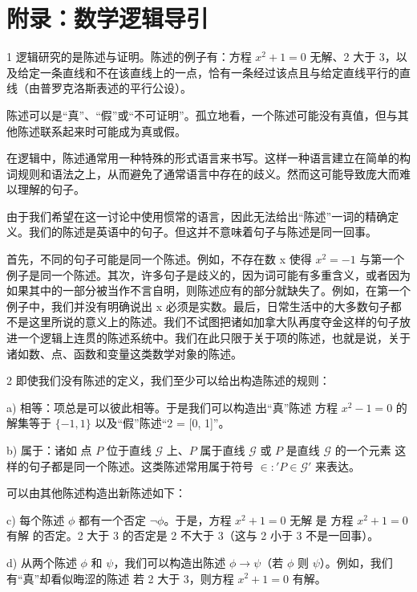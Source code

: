 \chapter*{附录：数学逻辑导引}

1 逻辑研究的是陈述与证明。陈述的例子有：方程  $ x^{2}+1=0 $ 无解、2 大于 3，以及给定一条直线和不在该直线上的一点，恰有一条经过该点且与给定直线平行的直线（由普罗克洛斯表述的平行公设）。

陈述可以是“真”、“假”或“不可证明”。孤立地看，一个陈述可能没有真值，但与其他陈述联系起来时可能成为真或假。

在逻辑中，陈述通常用一种特殊的形式语言来书写。这样一种语言建立在简单的构词规则和语法之上，从而避免了通常语言中存在的歧义。然而这可能导致庞大而难以理解的句子。

由于我们希望在这一讨论中使用惯常的语言，因此无法给出“陈述”一词的精确定义。我们的陈述是英语中的句子。但这并不意味着句子与陈述是同一回事。

首先，不同的句子可能是同一个陈述。例如，不存在数 x 使得  $ x^{2} = -1 $ 与第一个例子是同一个陈述。其次，许多句子是歧义的，因为词可能有多重含义，或者因为如果其中的一部分被当作不言自明，则陈述应有的部分就缺失了。例如，在第一个例子中，我们并没有明确说出 x 必须是实数。最后，日常生活中的大多数句子都不是这里所说的意义上的陈述。我们不试图把诸如加拿大队再度夺金这样的句子放进一个逻辑上连贯的陈述系统中。我们在此只限于关于项的陈述，也就是说，关于诸如数、点、函数和变量这类数学对象的陈述。

2 即使我们没有陈述的定义，我们至少可以给出构造陈述的规则：

a) 相等：项总是可以彼此相等。于是我们可以构造出“真”陈述 方程  $ x^2 - 1 = 0 $ 的解集等于  $ \{-1, 1\} $ 以及“假”陈述“2 = [0, 1]”。

b) 属于：诸如 点 $P$ 位于直线 $\mathcal{G}$ 上、$P$ 属于直线 $\mathcal{G}$ 或 $P$ 是直线 $\mathcal{G}$ 的一个元素 这样的句子都是同一个陈述。这类陈述常用属于符号 $\in: 'P \in \mathcal{G}'$ 来表达。

可以由其他陈述构造出新陈述如下：

c) 每个陈述  $ \phi $ 都有一个否定  $ \neg\phi $。于是，方程  $ x^2 + 1 = 0 $ 无解 是 方程  $ x^2 + 1 = 0 $ 有解 的否定。2 大于 3 的否定是 2 不大于 3（这与 2 小于 3 不是一回事）。

d) 从两个陈述  $ \phi $ 和  $ \psi $，我们可以构造出陈述  $ \phi \to \psi $（若  $ \phi $ 则  $ \psi $）。例如，我们有“真”却看似晦涩的陈述 若 2 大于 3，则方程  $ x^{2}+1=0 $ 有解。

